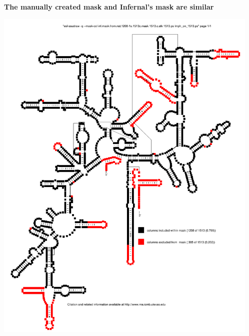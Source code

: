 \documentclass[landscape]{slides}
\begin{document}
\begin{slide}
\begin{center}
\textbf{The manually created mask and Infernal's mask are similar}
\end{center}
\small

\begin{center}
\includegraphics[height=6.5in]{figs/lmph-on-1513}

\end{center}
\end{slide}
\end{document}

